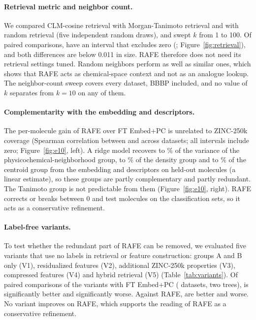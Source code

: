 \documentclass[pdflatex,sn-mathphys-num]{sn-jnl}%
\begin{document}
\paragraph{Retrieval metric and neighbor count.} We compared CLM-cosine retrieval with Morgan-Tanimoto retrieval and with random retrieval (five independent random draws), and swept $k$ from 1 to 100. Of \nkcomp{} paired comparisons, \nkexc{} have an interval that excludes zero (\excdetails; Figure~\ref{fig:retrieval}), and both differences are below 0.011 in size. RAFE therefore does not need its retrieval settings tuned. Random neighbors perform as well as similar ones, which shows that RAFE acts as chemical-space context and not as an analogue lookup. The neighbor-count sweep covers every dataset, BBBP included, and no value of $k$ separates from $k=10$ on any of them.

\paragraph{Complementarity with the embedding and descriptors.} The per-molecule gain of RAFE over FT Embed+PC is unrelated to ZINC-250k coverage (Spearman correlation between \spmin{} and \spmax{} across datasets; all intervals include zero; Figure~\ref{fig:e10}, left). A ridge model recovers \rgAlo{} to \rgAhi\% of the variance of the physicochemical-neighborhood group, \rgBlo{} to \rgBhi\% of the density group and \rgClo{} to \rgChi\% of the centroid group from the embedding and descriptors on held-out molecules (a linear estimate), so these groups are partly complementary and partly redundant. The Tanimoto group is not predictable from them (Figure~\ref{fig:e10}, right). RAFE corrects or breaks between 0 and \ecorrmax{} test molecules on the classification sets, so it acts as a conservative refinement.

\paragraph{Label-free variants.} To test whether the redundant part of RAFE can be removed, we evaluated five variants that use no labels in retrieval or feature construction: groups A and B only (V1), residualized features (V2), additional ZINC-250k properties (V3), compressed features (V4) and hybrid retrieval (V5) (Table~\ref{tab:variants}). Of \vn{} paired comparisons of the variants with FT Embed+PC (\nvards{} datasets, two trees), \vbetterft{} is significantly better and \vworseft{} significantly worse. Against RAFE, \vbetterrf{} are better and \vworserf{} worse. No variant improves on RAFE, which supports the reading of RAFE as a conservative refinement.
\end{document}
